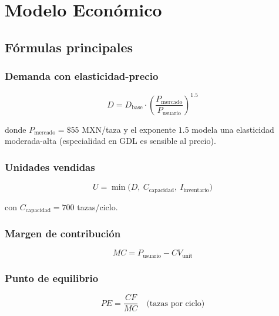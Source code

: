 \documentclass[12pt, a4paper]{article}
\begin{document}
\section{Modelo Económico}

\subsection{Fórmulas principales}

\subsubsection{Demanda con elasticidad-precio}

\begin{equation}
  D = D_{\text{base}} \cdot \left(\frac{P_{\text{mercado}}}{P_{\text{usuario}}}\right)^{1.5}
\end{equation}

donde $P_{\text{mercado}} = \$55$ MXN/taza y el exponente $1.5$ modela una
elasticidad moderada-alta (especialidad en GDL es sensible al precio).

\subsubsection{Unidades vendidas}

\begin{equation}
  U = \min\bigl(D,\ C_{\text{capacidad}},\ I_{\text{inventario}}\bigr)
\end{equation}

con $C_{\text{capacidad}} = 700$ tazas/ciclo.

\subsubsection{Margen de contribución}

\begin{equation}
  MC = P_{\text{usuario}} - CV_{\text{unit}}
\end{equation}

\subsubsection{Punto de equilibrio}

\begin{equation}
  PE = \frac{CF}{MC} \quad \text{(tazas por ciclo)}
\end{equation}
\end{document}
